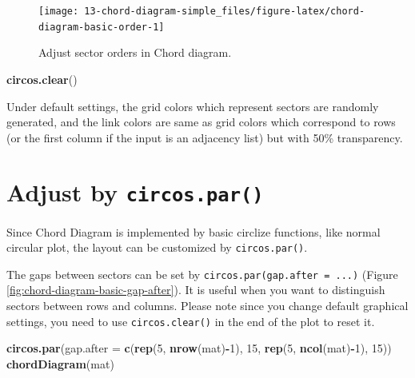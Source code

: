 \documentclass[]{book}
\newenvironment{Shaded}{\begin{snugshade}}{\end{snugshade}}
\newcommand{\KeywordTok}[1]{\textcolor[rgb]{0.13,0.29,0.53}{\textbf{#1}}}
\newcommand{\DataTypeTok}[1]{\textcolor[rgb]{0.13,0.29,0.53}{#1}}
\newcommand{\DecValTok}[1]{\textcolor[rgb]{0.00,0.00,0.81}{#1}}
\newcommand{\OperatorTok}[1]{\textcolor[rgb]{0.81,0.36,0.00}{\textbf{#1}}}
\newcommand{\NormalTok}[1]{#1}
\theoremstyle{definition}
\theoremstyle{definition}
\theoremstyle{remark}
\begin{document}
\begin{figure}

{\centering \texttt{[image: 13-chord-diagram-simple\_files/figure-latex/chord-diagram-basic-order-1]} 

}

\caption{Adjust sector orders in Chord diagram.}\label{fig:chord-diagram-basic-order}
\end{figure}

\begin{Shaded}
\begin{Highlighting}[]
\KeywordTok{circos.clear}\NormalTok{()}
\end{Highlighting}
\end{Shaded}

Under default settings, the grid colors which represent sectors are
randomly generated, and the link colors are same as grid colors which
correspond to rows (or the first column if the input is an adjacency
list) but with 50\% transparency.

\section{\texorpdfstring{Adjust by
\texttt{circos.par()}}{Adjust by circos.par()}}\label{adjust-by-circos.par}

Since Chord Diagram is implemented by basic circlize functions, like
normal circular plot, the layout can be customized by
\texttt{circos.par()}.

The gaps between sectors can be set by
\texttt{circos.par(gap.after\ =\ ...)} (Figure
\ref{fig:chord-diagram-basic-gap-after}). It is useful when you want to
distinguish sectors between rows and columns. Please note since you
change default graphical settings, you need to use
\texttt{circos.clear()} in the end of the plot to reset it.

\begin{Shaded}
\begin{Highlighting}[]
\KeywordTok{circos.par}\NormalTok{(}\DataTypeTok{gap.after =} \KeywordTok{c}\NormalTok{(}\KeywordTok{rep}\NormalTok{(}\DecValTok{5}\NormalTok{, }\KeywordTok{nrow}\NormalTok{(mat)}\OperatorTok{-}\DecValTok{1}\NormalTok{), }\DecValTok{15}\NormalTok{, }\KeywordTok{rep}\NormalTok{(}\DecValTok{5}\NormalTok{, }\KeywordTok{ncol}\NormalTok{(mat)}\OperatorTok{-}\DecValTok{1}\NormalTok{), }\DecValTok{15}\NormalTok{))}
\KeywordTok{chordDiagram}\NormalTok{(mat)}
\end{Highlighting}
\end{Shaded}
\end{document}
